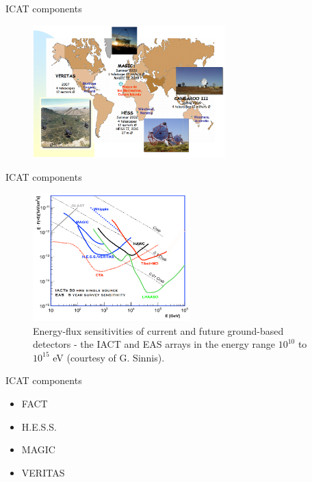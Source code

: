 \documentclass{beamer}
\begin{document}
\begin{frame}{ICAT components}
	\begin{figure}[h]
		\includegraphics[width=280px]{telescopes.png}
	\end{figure}
\end{frame}


\begin{frame}{ICAT components}
	\begin{figure}[h]
		\includegraphics[width=230px]{snesitivities.png}
		\caption{Energy-flux sensitivities of current and future ground-based detectors - the IACT and EAS arrays in the energy range $10^{10}$ to $10^{15}$ eV (courtesy of G. Sinnis).}
	\end{figure}
\end{frame}


\begin{frame}{ICAT components}
	\begin{itemize}
		\item FACT
		\item H.E.S.S.
		\item MAGIC
		\item VERITAS
	\end{itemize}
\end{frame}
\end{document}
